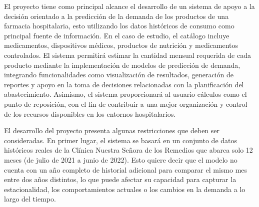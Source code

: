El proyecto tiene como principal alcance el desarrollo de un sistema de apoyo a la decisión orientado a la predicción de la demanda de los productos de una farmacia hospitalaria, esto utilizando los datos históricos de consumo como principal fuente de información. En el caso de estudio, el catálogo incluye medicamentos, dispositivos médicos, productos de nutrición y medicamentos controlados. El sistema permitirá estimar la cantidad mensual requerida de cada producto mediante la implementación de modelos de predicción de demanda, integrando funcionalidades como visualización de resultados, generación de reportes y apoyo en la toma de decisiones relacionadas con la planificación del abastecimiento. Asimismo, el sistema proporcionará al usuario cálculos como el punto de reposición, con el fin de contribuir a una mejor organización y control de los recursos disponibles en los entornos hospitalarios.

El desarrollo del proyecto presenta algunas restricciones que deben ser consideradas. En primer lugar, el sistema se basará en un conjunto de datos históricos reales de la Clínica Nuestra Señora de los Remedios que abarca solo 12 meses (de julio de 2021 a junio de 2022). Esto quiere decir que el modelo no cuenta con un año completo de historial adicional para comparar el mismo mes entre dos años distintos, lo que puede afectar su capacidad para capturar la estacionalidad, los comportamientos actuales o los cambios en la demanda a lo largo del tiempo.